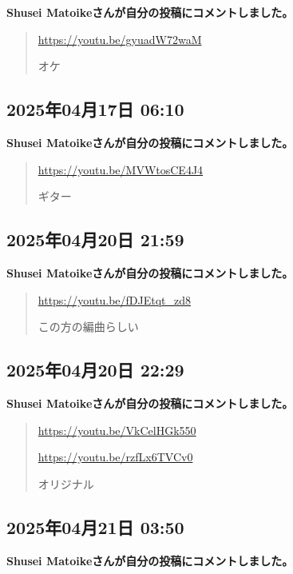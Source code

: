 \textbf{Shusei Matoikeさんが自分の投稿にコメントしました。}

\begin{quote}
\url{https://youtu.be/gyuadW72waM}

オケ
\end{quote}

\subsection*{2025年04月17日 06:10}

\textbf{Shusei Matoikeさんが自分の投稿にコメントしました。}

\begin{quote}
\url{https://youtu.be/MVWtosCE4J4}

ギター
\end{quote}

\subsection*{2025年04月20日 21:59}

\textbf{Shusei Matoikeさんが自分の投稿にコメントしました。}

\begin{quote}
\url{https://youtu.be/fDJEtqt_zd8}

この方の編曲らしい
\end{quote}

\subsection*{2025年04月20日 22:29}

\textbf{Shusei Matoikeさんが自分の投稿にコメントしました。}

\begin{quote}
\url{https://youtu.be/VkCelHGk550}

\url{https://youtu.be/rzfLx6TVCv0}

オリジナル
\end{quote}

\subsection*{2025年04月21日 03:50}

\textbf{Shusei Matoikeさんが自分の投稿にコメントしました。}

